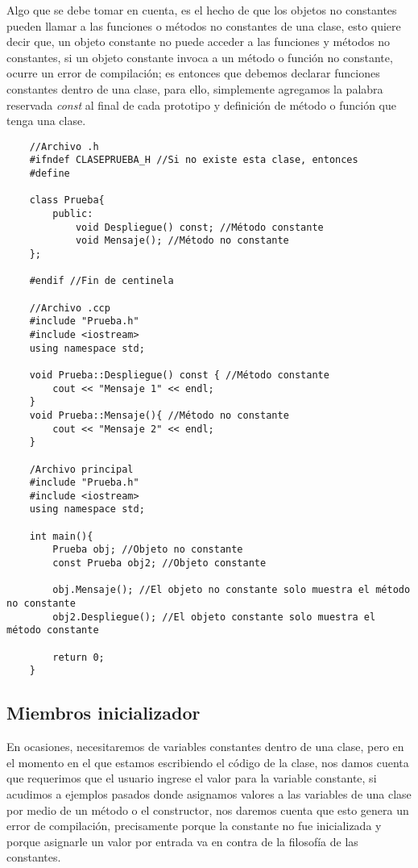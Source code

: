 Algo que se debe tomar en cuenta, es el hecho de que los objetos no constantes pueden llamar a las funciones o métodos no constantes de una clase, esto quiere decir que, un objeto constante no puede acceder a las funciones y métodos no constantes, si un objeto constante invoca a un método o función no constante, ocurre un error de compilación; es entonces que debemos declarar funciones constantes dentro de una clase, para ello, simplemente agregamos la palabra reservada \textit{const} al final de cada prototipo y definición de método o función que tenga una clase.
\begin{lstlisting}
    //Archivo .h
    #ifndef CLASEPRUEBA_H //Si no existe esta clase, entonces
    #define
    
    class Prueba{
        public:
            void Despliegue() const; //Método constante
            void Mensaje(); //Método no constante
    };
    
    #endif //Fin de centinela
    
    //Archivo .ccp
    #include "Prueba.h"
    #include <iostream>
    using namespace std;
    
    void Prueba::Despliegue() const { //Método constante
        cout << "Mensaje 1" << endl;
    }
    void Prueba::Mensaje(){ //Método no constante
        cout << "Mensaje 2" << endl;
    }
    
    /Archivo principal
    #include "Prueba.h"
    #include <iostream>
    using namespace std;
    
    int main(){
        Prueba obj; //Objeto no constante
        const Prueba obj2; //Objeto constante
        
        obj.Mensaje(); //El objeto no constante solo muestra el método no constante
        obj2.Despliegue(); //El objeto constante solo muestra el método constante
        
        return 0;
    }
\end{lstlisting}


\subsection{Miembros inicializador}
\hspace{0.55cm}En ocasiones, necesitaremos de variables constantes dentro de una clase, pero en el momento en el que estamos escribiendo el código de la clase, nos damos cuenta que requerimos que el usuario ingrese el valor para la variable constante, si acudimos a ejemplos pasados donde asignamos valores a las variables de una clase por medio de un método o el constructor, nos daremos cuenta que esto genera un error de compilación, precisamente porque la constante no fue inicializada y porque asignarle un valor por entrada va en contra de la filosofía de las constantes.

